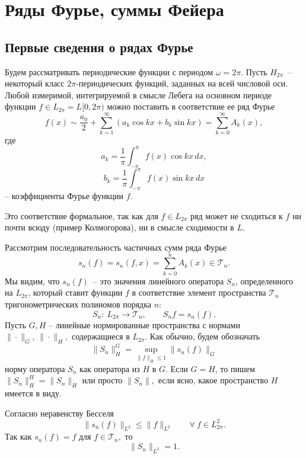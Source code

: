 
\chapter{Ряды Фурье, суммы Фейера} %

\section{Первые сведения о рядах Фурье}

Будем рассматривать периодические функции с периодом $\omega=2\pi$. Пусть {$H_{2\pi}$}~--
некоторый класс $2\pi$-периодических функций,
заданных на всей числовой оси. {Любой} измеримой{,} интегрируемой в смысле Лебега
на основном периоде функции {$f\in
L_{2\pi}=L[0,2\pi)$} можно {поставить в соответствие ее ряд} Фурье
\begin{equation}
\label{Fourier}
f(x)\sim \frac{a_0}{2}+\sum\limits_{k=1}^{\infty}(a_k \cos kx+b_k\sin kx)
= \sum\limits_{k=0}^{\infty}A_k(x),
\end{equation}
где
$$ a_k=\frac{1}{\pi} \int_{-\pi}^{\pi} f(x)\cos kx\,dx, $$
$$ b_k=\frac{1}{\pi} \int_{-\pi}^{\pi} f(x)\sin kx\,dx$$
-- коэффициенты Фурье функции $f$.

Это соответствие формальное, так как для {$f\in L_{2\pi}$} ряд может не сходиться к $f$ ни почти всюду
(пример Колмогорова), ни в смысле сходимости в $L$.

Рассмотрим последовательность частичных сумм ряда Фурье
$$ s_n(f)=s_n(f,x)=\sum\limits_{k=0}^{n} A_k(x)\in {\mathcal{T}_n}. $$
Мы видим, что $s_n(f)$~-- {это} значения линейного оператора {$S_n$}, определенного на
{$L_{2\pi}$}, который ставит функции {$f$} в
соответствие {элемент пространства ${\mathcal{T}_n}$} тригонометрических полиномов порядка $n$:
$$
{ S_n:\ L_{2\pi} \longrightarrow {\mathcal{T}_n},\qquad S_nf=s_n(f). }
$$
Пусть $G,H$ -- линейные нормированные пространства с нормами
$\|\cdot\|_G,\,\|\cdot\|_H,$ содержащиеся в $L_{2\pi}.$
Как обычно, будем обозначать
$$ \|S_n\|_{H}^{G}=\sup_{\|f\|_{H}\le 1} \|s_n(f)\|_{G} $$
норму оператора $S_n$ как оператора из $H$ в $G.$ Если $G=H$, то пишем $\|S_n\|_H^H=\|S_n\|_{H}$
или просто $\|S_n\|,$ если ясно, какое пространство $H$ имеется в виду.

Согласно неравенству Бесселя
$$ \|s_n(f)\|_{L^2}\le \|f\|_{L^2}\qquad \forall\ f\in L^2_{2\pi}. $$
Так как $s_n(f)=f$ для $f\in {\mathcal{T}_n},$ то
$$ \|S_n\|_{L^2} = 1. $$


